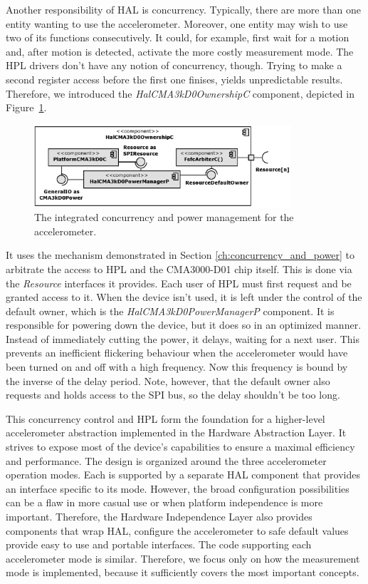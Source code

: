 Another responsibility of HAL is concurrency. Typically, there are more than one entity wanting to use the accelerometer. Moreover, one entity may wish to use two of its functions consecutively. It could, for example, first wait for a motion and, after motion is detected, activate the more costly measurement mode. The HPL drivers don't have any notion of concurrency, though. Trying to make a second register access before the first one finises, yields unpredictable results. Therefore, we introduced the \emph{HalCMA3kD0OwnershipC} component, depicted in Figure~\ref{fig:hal_cma3kd0_ownership_c}.
\begin{figure}[h]
  \centering
  \includegraphics[width=0.85\textwidth]{diagrams/hal_cma3kd0_ownership_c.eps}
  \caption{The integrated concurrency and power management for the accelerometer.}
  \label{fig:hal_cma3kd0_ownership_c}
\end{figure}
It uses the mechanism demonstrated in Section \ref{ch:concurrency_and_power} to arbitrate the access to HPL and the CMA3000-D01 chip itself. This is done via the \emph{Resource} interfaces it provides. Each user of HPL must first request and be granted access to it. When the device isn't used, it is left under the control of the default owner, which is the \emph{HalCMA3kD0PowerManagerP} component. It is responsible for powering down the device, but it does so in an optimized manner. Instead of immediately cutting the power, it delays, waiting for a next user. This prevents an inefficient flickering behaviour when the accelerometer would have been turned on and off with a high frequency. Now this frequency is bound by the inverse of the delay period. Note, however, that the default owner also requests and holds access to the SPI bus, so the delay shouldn't be too long.

This concurrency control and HPL form the foundation for a higher-level accelerometer abstraction implemented in the Hardware Abstraction Layer. It strives to expose most of the device's capabilities to ensure a maximal efficiency and performance. The design is organized around the three accelerometer operation modes. Each is supported by a separate HAL component that provides an interface specific to its mode. However, the broad configuration possibilities can be a flaw in more casual use or when platform independence is more important. Therefore, the Hardware Independence Layer also provides components that wrap HAL, configure the accelerometer to safe default values provide easy to use and portable interfaces. The code supporting each accelerometer mode is similar. Therefore, we focus only on how the measurement mode is implemented, because it sufficiently covers the most important concepts.

